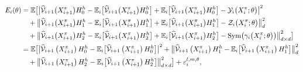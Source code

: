 \documentclass[12pt]{article}
\numberwithin{equation}{section}
\newcommand{\E}{\mathbb{E}}
\begin{document}
\begin{align}
		    \nonumber
 E_i(\theta) & = \E \big[ \big\lvert \widehat{\cal V}_{i+1}\big(X^\pi_{i+1}\big) H_0^h - \E_i\big[\widehat{\cal V}_{i+1}\big(X^\pi_{i+1}\big) H_0^h\big]
			+ \E_i\big[\widehat{\cal V}_{i+1}\big(X^\pi_{i+1}\big) H_0^h\big] - {\cal Y}_i\big(X^\pi_i ;\theta\big)\big\rvert^2
		    \\ \nonumber
		    & \quad + \big\lVert \widehat{\cal V}_{i+1}\big(X^\pi_{i+1}\big)H_1^h - \E_i\big[\widehat{\cal V}_{i+1}\big(X^\pi_{i+1}\big)H_1^h\big]
			    + \E_i\big[\widehat{\cal V}_{i+1}\big(X^\pi_{i+1}\big)H_1^h\big] - {\cal Z}_i\big(X^\pi_i ;\theta\big)\big\rVert_d^2
		    \\ \nonumber
		    & \quad + \big\lVert \widehat{\cal V}_{i+1}\big(X^\pi_{i+1}\big)H_2^h - \E_i\big[\widehat{\cal V}_{i+1}\big(X^\pi_{i+1}\big)H_2^h\big]
        + \E_i\big[\widehat{\cal V}_{i+1}\big(X^\pi_{i+1}\big)H_2^h\big] - {\rm Sym} \big( {\cal \gamma}_i\big(X^\pi_i ;\theta\big)\big) \big\rVert_{d\times d}^2\big]
		    \\ \nonumber
		    & = \E \big[ \big\lvert \widehat{\cal V}_{i+1}\left(X^\pi_{i+1}\right) H_0^h - \E_i\big[\widehat{\cal V}_{i+1}\left(X^\pi_{i+1}\right) H_0^h\big]\big\rvert^2
 + \big\lVert \widehat{\cal V}_{i+1}\left(X^\pi_{i+1}\right)H_1^h - \E_i\big[\widehat{\cal V}_{i+1}\left(X^\pi_{i+1}\right)H_1^h\big]\big\rVert_d^2
 \\
 \nonumber %
		    & \quad + \big\lVert \widehat{\cal V}_{i+1}\left(X^\pi_{i+1}\right)H_2^h - \E_i\big[\widehat{\cal V}_{i+1}\left(X^\pi_{i+1}\right)H_2^h\big]\big\rVert_{d\times d}^2
	    \big] + \varepsilon_i^{{l,m}, \theta},
\end{align}
\end{document}
